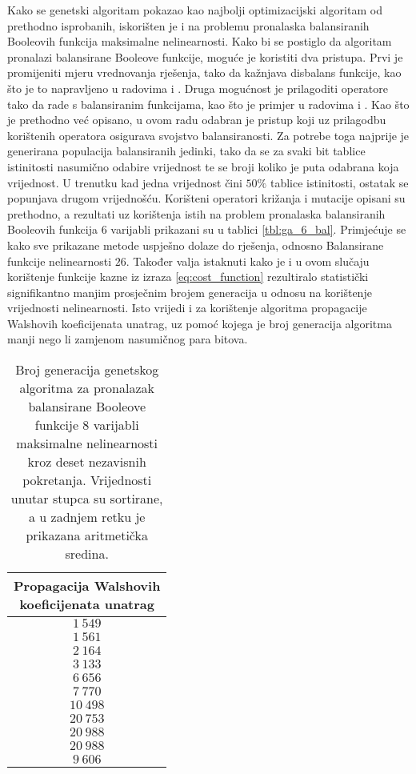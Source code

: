 Kako se genetski algoritam pokazao kao najbolji optimizacijski algoritam od prethodno isprobanih, iskorišten je i na problemu pronalaska balansiranih Booleovih funkcija maksimalne nelinearnosti. 
Kako bi se postiglo da algoritam pronalazi balansirane Booleove funkcije, moguće je koristiti dva pristupa.
Prvi je promijeniti mjeru vrednovanja rješenja, tako da kažnjava disbalans funkcije, kao što je to napravljeno u radovima \cite{MaximalNonlinearity} i \cite{CryptographicBoolean}.
Druga mogućnost je prilagoditi operatore tako da rade s balansiranim funkcijama, kao što je primjer u radovima \cite{millan1997effective} i \cite{manzoni2019balanced}.
Kao što je prethodno već opisano, u ovom radu odabran je pristup koji uz prilagodbu korištenih operatora osigurava svojstvo balansiranosti.
Za potrebe toga najprije je generirana populacija balansiranih jedinki, tako da se za svaki bit tablice istinitosti nasumično odabire vrijednost te se broji koliko je puta odabrana koja vrijednost.
U trenutku kad jedna vrijednost čini $50\%$ tablice istinitosti, ostatak se popunjava drugom vrijednošću.
Korišteni operatori križanja i mutacije opisani su prethodno, a rezultati uz korištenja istih na problem pronalaska balansiranih Booleovih funkcija $6$ varijabli prikazani su u tablici \ref{tbl:ga_6_bal}.
Primjećuje se kako sve prikazane metode uspješno dolaze do rješenja, odnosno Balansirane funkcije nelinearnosti $26$.
Također valja istaknuti kako je i u ovom slučaju korištenje funkcije kazne iz izraza \eqref{eq:cost_function} rezultiralo statistički signifikantno manjim prosječnim brojem generacija u odnosu na korištenje vrijednosti nelinearnosti.
Isto vrijedi i za korištenje algoritma propagacije Walshovih koeficijenata unatrag, uz pomoć kojega je broj generacija algoritma manji nego li zamjenom nasumičnog para bitova.

\begin{table}[]
    \centering
    \captionsetup{justification=centering}
    \caption{Broj generacija genetskog algoritma za pronalazak balansirane Booleove funkcije $8$ varijabli maksimalne nelinearnosti kroz deset nezavisnih pokretanja. Vrijednosti unutar stupca su sortirane, a u zadnjem retku je prikazana aritmetička sredina.}
    \begin{tabular}{c} \hline
        \makecell{Propagacija Walshovih \\ koeficijenata unatrag} \\ \hline
         $1\:549$ \\
         $1\:561$ \\
         $2\:164$ \\
         $3\:133$ \\
         $6\:656$ \\
         $7\:770$ \\
        $10\:498$ \\
        $20\:753$ \\
        $20\:988$ \\
        $20\:988$ \\ \hline
         $9\:606$
    \end{tabular}
    \label{tbl:ga_8_bal}
\end{table}

